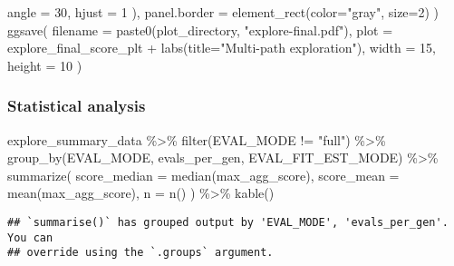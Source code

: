 \documentclass[
]{book}
\newenvironment{Shaded}{\begin{snugshade}}{\end{snugshade}}
\newcommand{\AttributeTok}[1]{\textcolor[rgb]{0.77,0.63,0.00}{#1}}
\newcommand{\DecValTok}[1]{\textcolor[rgb]{0.00,0.00,0.81}{#1}}
\newcommand{\FunctionTok}[1]{\textcolor[rgb]{0.00,0.00,0.00}{#1}}
\newcommand{\NormalTok}[1]{#1}
\newcommand{\SpecialCharTok}[1]{\textcolor[rgb]{0.00,0.00,0.00}{#1}}
\newcommand{\StringTok}[1]{\textcolor[rgb]{0.31,0.60,0.02}{#1}}
\begin{document}
\begin{Shaded}
\begin{Highlighting}[]
      \AttributeTok{angle =} \DecValTok{30}\NormalTok{,}
      \AttributeTok{hjust =} \DecValTok{1}
\NormalTok{    ),}
    \AttributeTok{panel.border =} \FunctionTok{element\_rect}\NormalTok{(}\AttributeTok{color=}\StringTok{"gray"}\NormalTok{, }\AttributeTok{size=}\DecValTok{2}\NormalTok{)}
\NormalTok{  )}
\FunctionTok{ggsave}\NormalTok{(}
  \AttributeTok{filename =} \FunctionTok{paste0}\NormalTok{(plot\_directory, }\StringTok{"explore{-}final.pdf"}\NormalTok{),}
  \AttributeTok{plot =}\NormalTok{ explore\_final\_score\_plt }\SpecialCharTok{+} \FunctionTok{labs}\NormalTok{(}\AttributeTok{title=}\StringTok{"Multi{-}path exploration"}\NormalTok{),}
  \AttributeTok{width =} \DecValTok{15}\NormalTok{,}
  \AttributeTok{height =} \DecValTok{10}
\NormalTok{)}
\end{Highlighting}
\end{Shaded}

\hypertarget{statistical-analysis-1}{%
\subsubsection{Statistical analysis}\label{statistical-analysis-1}}

\begin{Shaded}
\begin{Highlighting}[]
\NormalTok{explore\_summary\_data }\SpecialCharTok{\%\textgreater{}\%}
  \FunctionTok{filter}\NormalTok{(EVAL\_MODE }\SpecialCharTok{!=} \StringTok{"full"}\NormalTok{) }\SpecialCharTok{\%\textgreater{}\%}
  \FunctionTok{group\_by}\NormalTok{(EVAL\_MODE, evals\_per\_gen, EVAL\_FIT\_EST\_MODE) }\SpecialCharTok{\%\textgreater{}\%}
  \FunctionTok{summarize}\NormalTok{(}
    \AttributeTok{score\_median =} \FunctionTok{median}\NormalTok{(max\_agg\_score),}
    \AttributeTok{score\_mean =} \FunctionTok{mean}\NormalTok{(max\_agg\_score),}
    \AttributeTok{n =} \FunctionTok{n}\NormalTok{()}
\NormalTok{  ) }\SpecialCharTok{\%\textgreater{}\%}
  \FunctionTok{kable}\NormalTok{()}
\end{Highlighting}
\end{Shaded}

\begin{verbatim}
## `summarise()` has grouped output by 'EVAL_MODE', 'evals_per_gen'. You can
## override using the `.groups` argument.
\end{verbatim}
\end{document}
